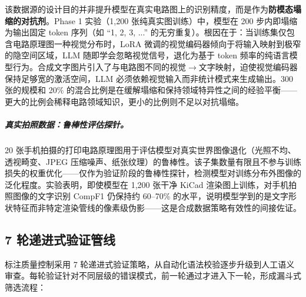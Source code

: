 该数据源的设计目的并非提升模型在真实电路图上的识别精度，而是作为\textbf{防模态塌缩的对抗剂}。Phase 1 实验（1,200 张纯真实图训练）中，模型在 200 步内即塌缩为输出固定 token 序列（如 ``1, 2, 3, ...'' 的无穷重复）。根因在于：当训练集仅包含电路原理图一种视觉分布时，LoRA 微调的视觉编码器倾向于将输入映射到极窄的隐空间区域，LLM 随即学会忽略视觉信号，退化为基于 token 频率的纯语言模型行为。合成文字图片引入了与电路图不同的视觉$\to$文字映射，迫使视觉编码器保持足够宽的激活空间，LLM 必须依赖视觉输入而非统计模式来生成输出。300 张的规模和 20\% 的混合比例是在缓解塌缩和保持领域特异性之间的经验平衡——更大的比例会稀释电路领域知识，更小的比例则不足以对抗塌缩。

\subparagraph{真实拍照数据：鲁棒性评估探针。}
20 张手机拍摄的打印电路原理图用于评估模型对真实世界图像退化（光照不均、透视畸变、JPEG 压缩噪声、纸张纹理）的鲁棒性。该子集数量有限且不参与训练损失的权重优化——仅作为验证阶段的鲁棒性探针，检测模型对训练分布外图像的泛化程度。实验表明，即使模型在 1,200 张干净 KiCad 渲染图上训练，对手机拍照图像的文字识别 CompF1 仍保持约 60--70\% 的水平，说明模型学到的是文字形状特征而非特定渲染管线的像素级伪影——这是合成数据策略有效性的间接佐证。

\subsection{7 轮递进式验证管线}

标注质量控制采用 7 轮递进式验证策略，从自动化语法校验逐步升级到人工语义审查。每轮验证针对不同层级的错误模式，前一轮通过才进入下一轮，形成漏斗式筛选流程：

